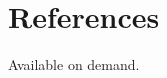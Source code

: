 \documentclass[10pt,a4paper]{moderncv} %
\begin{document}




\section{References}

Available on demand.

\end{document}
